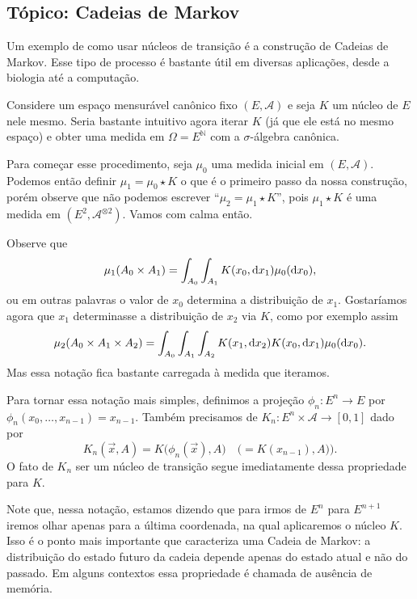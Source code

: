 \begin{topics}

\section{Tópico: Cadeias de Markov}
\label{s:cadeias_Markov}

Um exemplo de como usar núcleos de transição é a construção de Cadeias de Markov.
Esse tipo de processo é bastante útil em diversas aplicações, desde a biologia até a computação.

Considere um espaço mensurável canônico fixo $(E, \mathcal{A})$ e seja $K$ um núcleo de $E$ nele mesmo.
Seria bastante intuitivo agora iterar $K$ (já que ele está no mesmo espaço)
e obter uma medida em $\Omega =E^{\mathbb{N}}$ com a $\sigma$-álgebra canônica.

Para começar esse procedimento, seja $\mu_0$ uma medida inicial em $(E, \mathcal{A})$.
Podemos então definir $\mu_1 = \mu_0 \star K$ o que é o primeiro passo da nossa construção, porém observe que não podemos escrever ``$\mu_2 = \mu_1 \star K$'', pois $\mu_1 \star K$ é uma medida em $(E^2, \mathcal{A}^{\otimes 2})$.
Vamos com calma então.

Observe que
\begin{equation}
  \mu_1(A_0 \times A_1) = \int_{A_0} \int_{A_1} K(x_0, \mathop{}\!\mathrm{d} x_1) \mu_0(\mathop{}\!\mathrm{d} x_0),
\end{equation}
ou em outras palavras o valor de $x_0$ determina a distribuição de $x_1$.
Gostaríamos agora que $x_1$ determinasse a distribuição de $x_2$ via $K$, como por exemplo assim
\begin{equation}
  \mu_2(A_0 \times A_1 \times A_2) = \int_{A_0} \int_{A_1} \int_{A_2} K(x_1, \mathop{}\!\mathrm{d} x_2) K(x_0, \mathop{}\!\mathrm{d} x_1) \mu_0 (\mathop{}\!\mathrm{d} x_0).
\end{equation}
Mas essa notação fica bastante carregada à medida que iteramos.

Para tornar essa notação mais simples, definimos a projeção $\phi_n:E^n \to E$ por $\phi_n(x_0, \dots, x_{n-1}) = x_{n-1}$.
Também precisamos de $K_n: E^n \times \mathcal{A} \to [0,1]$ dado por
\begin{equation}
  K_n(\vec{x},A) = K\big(\phi_n(\vec{x}), A\big) \quad \big(= K(x_{n-1}),A) \big).
\end{equation}
O fato de $K_n$ ser um núcleo de transição segue imediatamente dessa propriedade para $K$.

Note que, nessa notação, estamos dizendo que para irmos de $E^n$ para $E^{n+1}$ iremos olhar apenas para a última coordenada, na qual aplicaremos o núcleo $K$.
Isso é o ponto mais importante que caracteriza uma Cadeia de Markov: a distribuição do estado futuro da cadeia depende apenas do estado atual e não do passado.
Em alguns contextos essa propriedade é chamada de ausência de memória.


\end{topics}
